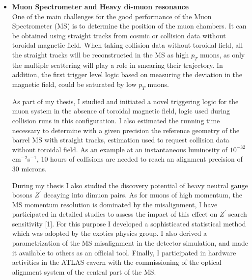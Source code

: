 \documentclass[12pt]{article}
\begin{document}
\begin{itemize}[leftmargin=1.3cm]
\itemsep0.8em

 \item[] {\bf Muon Spectrometer and Heavy di-muon resonance}\\
One of the main challenges for the good performance of the Muon Spectrometer (MS) is to determine the position of the muon chambers. 
It can be obtained using straight tracks from cosmic or collision data without toroidal magnetic field. 
When taking collision data without toroidal field, all the straight tracks will be reconstructed in the MS as high $p_T$ muons, as only the multiple 
scattering will play a role in smearing their trajectory. In addition, the first trigger level logic based on measuring the deviation in the magnetic field,
could be saturated by low $p_T$ muons.
\vspace{2.5mm}

As part of my thesis, I studied and initiated a novel triggering logic for the muon system in the absence of toroidal magnetic field, logic used during 
collision runs in this configuration. I also estimated the running time necessary to determine with a given precision the reference geometry 
of the barrel MS with straight tracks, estimation used to request collision data without toroidal field. 
As an example at an instantaneous luminosity of $10^{-32}$ cm$^{-2}$s$^{-1}$, 10 hours of collisions are needed to reach an alignment precision of 30 microns. 
\vspace{2.5mm}

 
During my thesis I also studied the discovery potential of heavy neutral gauge bosons $Z^{\prime}$ decaying into dimuon pairs. 
As for muons of high momentum, the MS momentum resolution is dominated by the misalignment, I have participated in detailed studies to assess the impact of this effect on $Z^{\prime}$ 
search sensitivity [1]. For this purpose I developed a sophisticated statistical method which was adopted by the exotics physics group. I also derived a parametrization of the MS misalignment 
in the detector simulation, and made it available to others as an official tool.
Finally, I participated in hardware activities in the ATLAS cavern with the 
commissioning of the optical alignment system of the central part of the MS.



\end{itemize}
\end{document}
